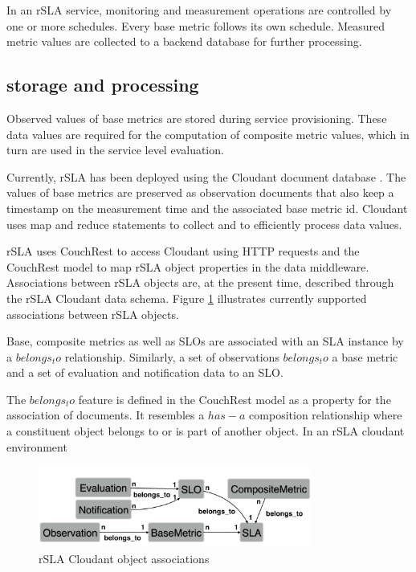 In an rSLA service, monitoring and measurement operations are controlled by one or more schedules. Every base metric follows its own schedule. Measured metric values are collected to a backend database for further processing. 
\subsection{storage and processing}
Observed values of base metrics are stored during service provisioning. These data values are required for the computation of composite metric values, which in turn are used in the service level evaluation. 

Currently, rSLA has been deployed using the Cloudant document database \cite{cloudant}. The values of base metrics are preserved as observation documents that also keep a timestamp on the measurement time and the associated base metric id. Cloudant uses map and reduce statements to collect and to efficiently process data values. 

rSLA uses CouchRest \cite{couchrest} to access Cloudant using HTTP requests and the CouchRest model to map rSLA object properties in the data middleware. Associations between rSLA objects are, at the present time, described through the rSLA Cloudant data schema. Figure \ref{schema} illustrates currently supported associations between rSLA objects.

Base, composite metrics as well as SLOs are associated with an SLA instance by a $belongs_to$ relationship. Similarly, a set of observations $belongs_to$ a base metric and a set of evaluation and notification data to an SLO. 

The $belongs_to$ feature is defined in the CouchRest model as a property for the association of documents. It resembles a $has-a$ composition relationship where a constituent object belongs to or is part of another object. In an rSLA cloudant environment 


\begin{figure}
\centering
\includegraphics[width=0.8\textwidth]{pics/schema}
\caption{\label{schema} rSLA Cloudant object associations}
\end{figure}


